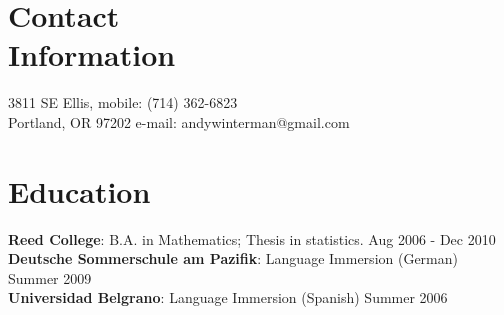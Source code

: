 \documentclass[margin,line]{resume}
\begin{document}
\begin{resume}

    \section{\mysidestyle Contact\\Information}


    3811 SE Ellis,                           \hfill  mobile: (714) 362-6823          \vspace{0mm}\\\vspace{0mm}%
    Portland, OR 97202                         \hfill     e-mail: andywinterman@gmail.com      \vspace{0mm}\\%
  \vspace{-4.5mm}%

    \section{\mysidestyle Education}

\textbf{Reed College}: B.A. in Mathematics; Thesis in statistics.
 \vspace{1mm} \hfill Aug 2006 - Dec 2010 \vspace{1mm}\\
\textbf{Deutsche Sommerschule am Pazifik}:  Language Immersion (German) \vspace{1mm} \hfill Summer 2009
\vspace{1mm} \\
\textbf{Universidad Belgrano}: Language Immersion (Spanish) \vspace{1mm} \hfill Summer 2006 \vspace{1mm}


\end{resume}
\end{document}
